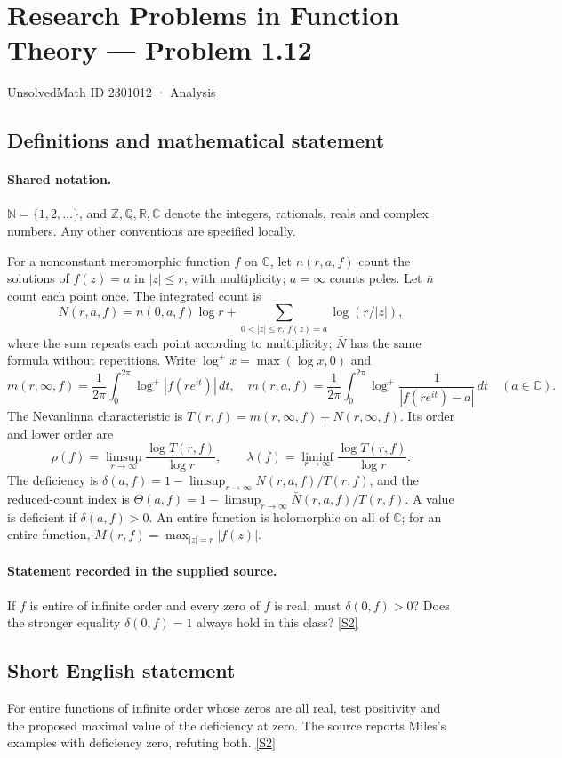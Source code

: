 \documentclass[11pt]{article}
\newcommand{\sref}[2]{\hyperlink{source:#1:#2}{[S#2]}}
\begin{document}
\setcounter{section}{2301011}
\section{Research Problems in Function Theory — Problem 1.12}\label{2301012}
{\small\sffamily UnsolvedMath ID 2301012 · Analysis}
\subsection{Definitions and mathematical statement}

\paragraph{Shared notation.}$\mathbb N=\{1,2,\ldots\}$, and $\mathbb Z,\mathbb Q,\mathbb R,\mathbb C$ denote the integers, rationals, reals and complex numbers. Any other conventions are specified locally.


For a nonconstant meromorphic function $f$ on $\mathbb C$, let $n(r,a,f)$ count the solutions of $f(z)=a$ in $|z|\le r$, with multiplicity; $a=\infty$ counts poles. Let $\bar n$ count each point once. The integrated count is
\[
 N(r,a,f)=n(0,a,f)\log r+\sum_{0<|z|\le r,\ f(z)=a}\log(r/|z|),
\]
where the sum repeats each point according to multiplicity; $\bar N$ has the same formula without repetitions. Write $\log^+x=\max(\log x,0)$ and
\[
 m(r,\infty,f)=\frac1{2\pi}\int_0^{2\pi}\log^+|f(re^{it})|\,dt,\quad
 m(r,a,f)=\frac1{2\pi}\int_0^{2\pi}\log^+\frac1{|f(re^{it})-a|}\,dt\quad(a\in\mathbb C).
\]
The Nevanlinna characteristic is $T(r,f)=m(r,\infty,f)+N(r,\infty,f)$. Its order and lower order are
\[
 \rho(f)=\limsup_{r\to\infty}\frac{\log T(r,f)}{\log r},\qquad
 \lambda(f)=\liminf_{r\to\infty}\frac{\log T(r,f)}{\log r}.
\]
The deficiency is $\delta(a,f)=1-\limsup_{r\to\infty}N(r,a,f)/T(r,f)$, and the reduced-count index is $\Theta(a,f)=1-\limsup_{r\to\infty}\bar N(r,a,f)/T(r,f)$. A value is deficient if $\delta(a,f)>0$. An entire function is holomorphic on all of $\mathbb C$; for an entire function, $M(r,f)=\max_{|z|=r}|f(z)|$.
\paragraph{Statement recorded in the supplied source.}
If $f$ is entire of infinite order and every zero of $f$ is real, must $\delta(0,f)>0$? Does the stronger equality $\delta(0,f)=1$ always hold in this class? \sref{2301012}{2}
\subsection{Short English statement}
For entire functions of infinite order whose zeros are all real, test positivity and the proposed maximal value of the deficiency at zero. The source reports Miles’s examples with deficiency zero, refuting both. \sref{2301012}{2}
\end{document}
